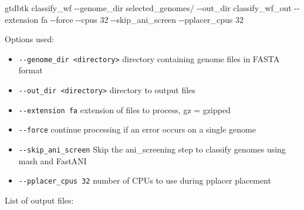 \documentclass[
]{book}
\newenvironment{Shaded}{\begin{snugshade}}{\end{snugshade}}
\newcommand{\AttributeTok}[1]{\textcolor[rgb]{0.13,0.29,0.53}{#1}}
\newcommand{\ExtensionTok}[1]{#1}
\newcommand{\NormalTok}[1]{#1}
\providecommand{\tightlist}{%
  \setlength{\itemsep}{0pt}\setlength{\parskip}{0pt}}
\begin{document}
\begin{Shaded}
\begin{Highlighting}[]
\ExtensionTok{gtdbtk}\NormalTok{ classify\_wf }\AttributeTok{{-}{-}genome\_dir}\NormalTok{ selected\_genomes/ }\AttributeTok{{-}{-}out\_dir}\NormalTok{ classify\_wf\_out }\AttributeTok{{-}{-}extension}\NormalTok{ fa }\AttributeTok{{-}{-}force} \AttributeTok{{-}{-}cpus}\NormalTok{ 32 }\AttributeTok{{-}{-}skip\_ani\_screen} \AttributeTok{{-}{-}pplacer\_cpus}\NormalTok{ 32}
\end{Highlighting}
\end{Shaded}

Options used:

\begin{itemize}
\tightlist
\item
  \texttt{-\/-genome\_dir\ \textless{}directory\textgreater{}} directory containing genome files in FASTA format\\
\item
  \texttt{-\/-out\_dir\ \textless{}directory\textgreater{}} directory to output files
\item
  \texttt{-\/-extension\ fa} extension of files to process, gz = gzipped
\item
  \texttt{-\/-force} continue processing if an error occurs on a single genome
\item
  \texttt{-\/-skip\_ani\_screen} Skip the ani\_screening step to classify genomes using mash and FastANI
\item
  \texttt{-\/-pplacer\_cpus\ 32} number of CPUs to use during pplacer placement
\end{itemize}

List of output files:
\end{document}
